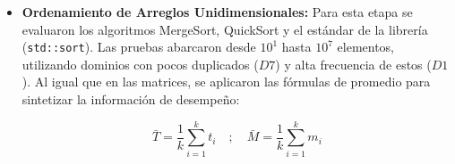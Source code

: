 \begin{itemize}
    \item \textbf{Ordenamiento de Arreglos Unidimensionales:}
    Para esta etapa se evaluaron los algoritmos MergeSort, QuickSort y el estándar de la librería (\texttt{std::sort}). Las pruebas abarcaron desde $10^1$ hasta $10^7$ elementos, utilizando dominios con pocos duplicados ($D7$) y alta frecuencia de estos ($D1$). Al igual que en las matrices, se aplicaron las fórmulas de promedio para sintetizar la información de desempeño:

    \[ \bar{T} = \frac{1}{k} \sum_{i=1}^{k} t_i \quad ; \quad \bar{M} = \frac{1}{k} \sum_{i=1}^{k} m_i \]

    \begin{table}[H]
    \centering
    \caption{Resultados de Ordenamiento: Comparativa de rendimiento y promedios}
    \label{tab:comparativa_sorting}
    

\end{table}
\end{itemize}
